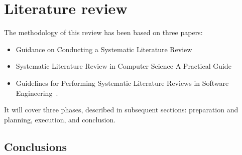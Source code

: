 \section{Literature review}\label{sec:literature-review}

The methodology of this review has been based on three papers:
\begin{itemize}
    \item Guidance on Conducting a Systematic Literature Review~\cite{xiao_guidance_2019}
    \item Systematic Literature Review in Computer Science \textendash A Practical Guide~\cite{neiva_systematic_2016}
    \item Guidelines for Performing Systematic Literature Reviews in Software Engineering~\cite{kitchenham_guidelines_2007}.
\end{itemize}
It will cover three phases, described in subsequent sections: preparation and planning, execution, and conclusion.





\subsection{Conclusions}\label{subsec:conclusions}
